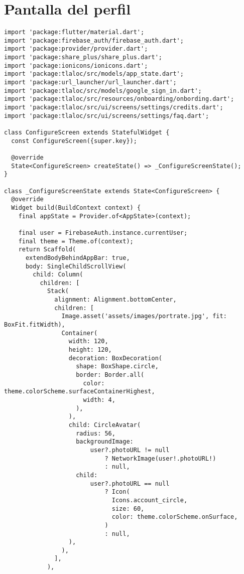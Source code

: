 \section{Pantalla del perfil}
\label{anexo:alg16}
\begin{verbatim}
import 'package:flutter/material.dart';
import 'package:firebase_auth/firebase_auth.dart';
import 'package:provider/provider.dart';
import 'package:share_plus/share_plus.dart';
import 'package:ionicons/ionicons.dart';
import 'package:tlaloc/src/models/app_state.dart'; 
import 'package:url_launcher/url_launcher.dart';
import 'package:tlaloc/src/models/google_sign_in.dart';
import 'package:tlaloc/src/resources/onboarding/onbording.dart';
import 'package:tlaloc/src/ui/screens/settings/credits.dart';
import 'package:tlaloc/src/ui/screens/settings/faq.dart';

class ConfigureScreen extends StatefulWidget {
  const ConfigureScreen({super.key});

  @override
  State<ConfigureScreen> createState() => _ConfigureScreenState();
}

class _ConfigureScreenState extends State<ConfigureScreen> {
  @override
  Widget build(BuildContext context) {
    final appState = Provider.of<AppState>(context);

    final user = FirebaseAuth.instance.currentUser;
    final theme = Theme.of(context);
    return Scaffold(
      extendBodyBehindAppBar: true,
      body: SingleChildScrollView(
        child: Column(
          children: [
            Stack(
              alignment: Alignment.bottomCenter,
              children: [
                Image.asset('assets/images/portrate.jpg', fit: BoxFit.fitWidth),
                Container(
                  width: 120,
                  height: 120,
                  decoration: BoxDecoration(
                    shape: BoxShape.circle,
                    border: Border.all(
                      color: theme.colorScheme.surfaceContainerHighest,
                      width: 4,
                    ),
                  ),
                  child: CircleAvatar(
                    radius: 56,
                    backgroundImage:
                        user?.photoURL != null
                            ? NetworkImage(user!.photoURL!)
                            : null,
                    child:
                        user?.photoURL == null
                            ? Icon(
                              Icons.account_circle,
                              size: 60,
                              color: theme.colorScheme.onSurface,
                            )
                            : null,
                  ),
                ),
              ],
            ),


\end{verbatim}
